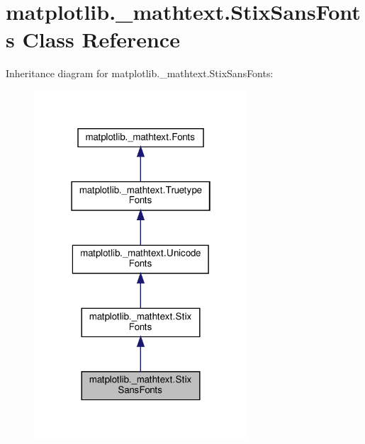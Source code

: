 \hypertarget{classmatplotlib_1_1__mathtext_1_1StixSansFonts}{}\section{matplotlib.\+\_\+mathtext.\+Stix\+Sans\+Fonts Class Reference}
\label{classmatplotlib_1_1__mathtext_1_1StixSansFonts}


Inheritance diagram for matplotlib.\+\_\+mathtext.\+Stix\+Sans\+Fonts\+:
\nopagebreak
\begin{figure}[H]
\begin{center}
\leavevmode
\includegraphics[width=226pt]{classmatplotlib_1_1__mathtext_1_1StixSansFonts__inherit__graph}
\end{center}
\end{figure}


